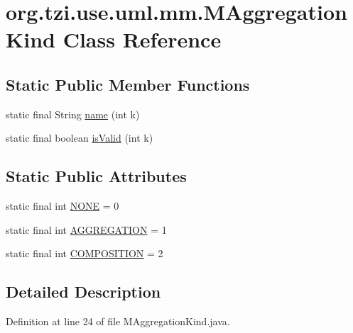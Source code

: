 \hypertarget{classorg_1_1tzi_1_1use_1_1uml_1_1mm_1_1_m_aggregation_kind}{\section{org.\-tzi.\-use.\-uml.\-mm.\-M\-Aggregation\-Kind Class Reference}
\label{classorg_1_1tzi_1_1use_1_1uml_1_1mm_1_1_m_aggregation_kind}
}
\subsection*{Static Public Member Functions}
\begin{DoxyCompactItemize}
\item 
static final String \hyperlink{classorg_1_1tzi_1_1use_1_1uml_1_1mm_1_1_m_aggregation_kind_ae63e809cb8c5a34164b9f027cebcbd98}{name} (int k)
\item 
static final boolean \hyperlink{classorg_1_1tzi_1_1use_1_1uml_1_1mm_1_1_m_aggregation_kind_a68da00e77b1490452579dfe5a7f8fd80}{is\-Valid} (int k)
\end{DoxyCompactItemize}
\subsection*{Static Public Attributes}
\begin{DoxyCompactItemize}
\item 
static final int \hyperlink{classorg_1_1tzi_1_1use_1_1uml_1_1mm_1_1_m_aggregation_kind_ae36fcdc17fcf5c81d423694e8d4d66a4}{N\-O\-N\-E} = 0
\item 
static final int \hyperlink{classorg_1_1tzi_1_1use_1_1uml_1_1mm_1_1_m_aggregation_kind_adb5c004017554ff49f8ef49f2b704526}{A\-G\-G\-R\-E\-G\-A\-T\-I\-O\-N} = 1
\item 
static final int \hyperlink{classorg_1_1tzi_1_1use_1_1uml_1_1mm_1_1_m_aggregation_kind_a10b5f49197e406a842cc9209279346a8}{C\-O\-M\-P\-O\-S\-I\-T\-I\-O\-N} = 2
\end{DoxyCompactItemize}


\subsection{Detailed Description}


Definition at line 24 of file M\-Aggregation\-Kind.\-java.



